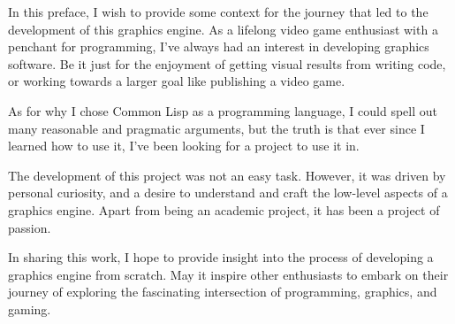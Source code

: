 In this preface,
I wish to provide some context for the journey that led to the development of this graphics engine.
As a lifelong video game enthusiast with a penchant for programming,
I've always had an interest in developing graphics software.
Be it just for the enjoyment of getting visual results from writing code,
or working towards a larger goal like publishing a video game.

As for why I chose Common Lisp as a programming language,
I could spell out many reasonable and pragmatic arguments,
but the truth is that ever since I learned how to use it,
I've been looking for a project to use it in.

The development of this project was not an easy task.
However, it was driven by personal curiosity,
and a desire to understand and craft the low-level aspects of a graphics engine.
Apart from being an academic project,
it has been a project of passion.

In sharing this work,
I hope to provide insight into the process of developing a graphics engine from scratch.
May it inspire other enthusiasts to embark on their journey of exploring the fascinating intersection of programming, graphics, and gaming.

